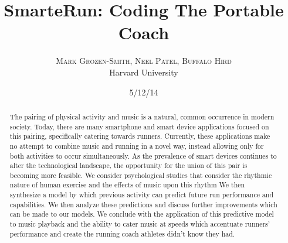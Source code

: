 \documentclass[twoside]{article}
\title{\vspace{-15mm}\fontsize{24pt}{10pt}\selectfont\textbf{SmarteRun: Coding The Portable Coach}} %
\author{
\large
\textsc{Mark Grozen-Smith, Neel Patel, Buffalo Hird}\\[2mm] %
\normalsize Harvard University \\ %
\vspace{-5mm}
}
\date{5/12/14}
\begin{document}
\maketitle %

\thispagestyle{fancy} %


\begin{abstract}

\noindent The pairing of physical activity and music is a natural, common occurrence in modern society.  Today, there are many smartphone and smart device applications focused on this pairing, specifically catering towards runners. Currently, these applications make no attempt to combine music and running in a novel way, instead allowing only for both activities to occur simultaneously. As the prevalence of smart devices continues to alter the technological landscape, the opportunity for the union of this pair is becoming more feasible.  We consider psychological studies that consider the rhythmic nature of human exercise and the effects of music upon this rhythm  We then synthesize a model by which previous activity can predict future run performance and capabilities. We then analyze these predictions and discuss further improvements which can be made to our models. We conclude with the application of this predictive model to music playback and the ability to cater music at speeds which accentuate runners’ performance and create the running coach athletes didn’t know they had.

\end{abstract}

\end{document}

